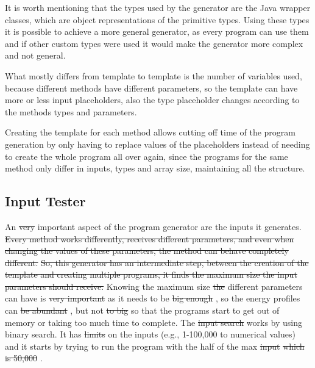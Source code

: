 It is worth mentioning that the types used by the generator are the Java wrapper classes, which are object representations of the primitive types. Using these types it is possible to achieve a more general generator, as every program can use them and if other custom types were used it would make the generator more complex and not general.

What mostly differs from template to template is the number of variables used, because different methods have different parameters, so the template can have more or less input placeholders, also the type placeholder changes according to the methods types and parameters.


Creating the template for each method allows cutting off time of the program generation by only having to replace values of the placeholders instead of needing to create the whole program all over again, since the programs for the same method only differ in inputs, types and array size, maintaining all the structure.

\subsection{Input Tester} \label{sec:work_stage1_input_tester}

An \st{very} important aspect of the program generator are the inputs it generates. \st{Every method works differently, receives different parameters, and even when changing the values of these parameters, the method can behave completely different.}  \st{So, this generator has an intermediate step, between the creation of the template and creating multiple programs, it finds the maximum size the input parameters should receive.}  Knowing the maximum size \st{the}  different parameters can have is \st{very important}  as it needs to be \st{big enough} , so the energy profiles can \st{be abundant} , but not \st{to big}  so that the programs start to get out of memory or taking too much time to complete.
The \st{input search}  works by using binary search. It has \st{limits}  on the inputs (e.g., 1-100,000 to numerical values) and it starts by trying to run the program with the half of the max \st{input}  \st{which is 50,000} . 

